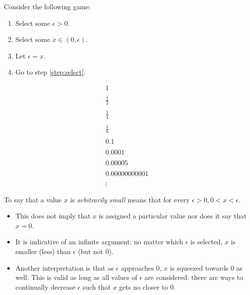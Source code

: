 \documentclass[letterpaper,12pt,fleqn]{article}
\newcommand{\e}{\epsilon}
\begin{document}
\begin{example}
  Consider the following game:
  \begin{enumerate}
  \item Select some \(\e>0\).
  \item\label{step:select} Select some \(x\in(0,\e)\).
  \item Let \(\e=x\).
  \item Go to step \ref{step:select}.
  \end{enumerate}

  \[\begin{array}{l}
  1 \\
  \\
  \frac{1}{2} \\
  \\
  \frac{1}{4} \\
  \\
  \frac{1}{8} \\
  \\
  0.1 \\
  \\
  0.0001 \\
  \\
  0.00005 \\
  \\
  0.00000000001 \\
  \\
  \vdots
  \end{array}\]
\end{example}

\begin{definition}
  To say that a value \(x\) is \emph{arbitrarily small} means that for every \(\e>0,0<x<\e\).
\end{definition}

\begin{itemize}[left=0in]
\item This does not imply that \(x\) is assigned a particular value nor does it say that \(x=0\).
\item It is indicative of an infinite argument: no matter which \(\e\) is selected, \(x\) is smaller (less) than
  \(\e\) (but not \(0\)).
\item Another interpretation is that as \(\e\) approaches \(0\), \(x\) is squeezed towards \(0\) as well.  This is
  valid as long as all values of \(\e\) are considered: there are ways to continually decrease \(\e\) such that
  \(x\) gets no closer to \(0\).
\end{itemize}
\end{document}
